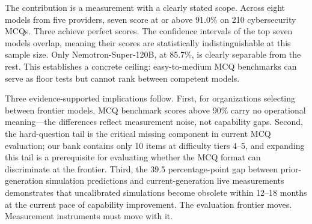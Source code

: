\documentclass[final]{elsarticle}
\begin{document}
The contribution is a measurement with a clearly stated scope. Across eight models from five providers, seven score at or above 91.0\% on 210 cybersecurity MCQs. Three achieve perfect scores. The confidence intervals of the top seven models overlap, meaning their scores are statistically indistinguishable at this sample size. Only Nemotron-Super-120B, at 85.7\%, is clearly separable from the rest. This establishes a concrete ceiling: easy-to-medium MCQ benchmarks can serve as floor tests but cannot rank between competent models.

Three evidence-supported implications follow. First, for organizations selecting between frontier models, MCQ benchmark scores above 90\% carry no operational meaning---the differences reflect measurement noise, not capability gaps. Second, the hard-question tail is the critical missing component in current MCQ evaluation; our bank contains only 10 items at difficulty tiers 4--5, and expanding this tail is a prerequisite for evaluating whether the MCQ format can discriminate at the frontier. Third, the 39.5 percentage-point gap between prior-generation simulation predictions and current-generation live measurements demonstrates that uncalibrated simulations become obsolete within 12--18 months at the current pace of capability improvement. The evaluation frontier moves. Measurement instruments must move with it.



\end{document}
